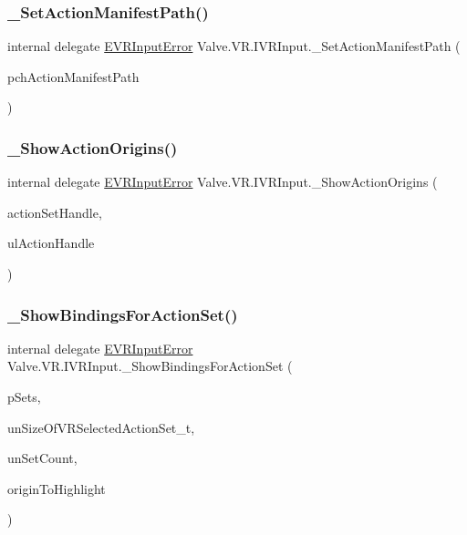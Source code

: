 \subsubsection{\texorpdfstring{\_SetActionManifestPath()}{\_SetActionManifestPath()}}
{\footnotesize\ttfamily internal delegate \mbox{\hyperlink{namespace_valve_1_1_v_r_a592d7f4189b8346d6c96dbdbaa35bc1b}{E\+V\+R\+Input\+Error}} Valve.\+V\+R.\+I\+V\+R\+Input.\+\_\+\+Set\+Action\+Manifest\+Path (\begin{DoxyParamCaption}\item[{string}]{pch\+Action\+Manifest\+Path }\end{DoxyParamCaption})}

\mbox{\label{struct_valve_1_1_v_r_1_1_i_v_r_input_a09f1677e540d63032f2fd346bcde9ff7}} 
\subsubsection{\texorpdfstring{\_ShowActionOrigins()}{\_ShowActionOrigins()}}
{\footnotesize\ttfamily internal delegate \mbox{\hyperlink{namespace_valve_1_1_v_r_a592d7f4189b8346d6c96dbdbaa35bc1b}{E\+V\+R\+Input\+Error}} Valve.\+V\+R.\+I\+V\+R\+Input.\+\_\+\+Show\+Action\+Origins (\begin{DoxyParamCaption}\item[{ulong}]{action\+Set\+Handle,  }\item[{ulong}]{ul\+Action\+Handle }\end{DoxyParamCaption})}

\mbox{\label{struct_valve_1_1_v_r_1_1_i_v_r_input_a88a0bc2f348e8f0bf77bf25907434041}} 
\subsubsection{\texorpdfstring{\_ShowBindingsForActionSet()}{\_ShowBindingsForActionSet()}}
{\footnotesize\ttfamily internal delegate \mbox{\hyperlink{namespace_valve_1_1_v_r_a592d7f4189b8346d6c96dbdbaa35bc1b}{E\+V\+R\+Input\+Error}} Valve.\+V\+R.\+I\+V\+R\+Input.\+\_\+\+Show\+Bindings\+For\+Action\+Set (\begin{DoxyParamCaption}\item[{\mbox{[}\+In, Out\mbox{]} \mbox{\hyperlink{struct_valve_1_1_v_r_1_1_v_r_active_action_set__t}{V\+R\+Active\+Action\+Set\+\_\+t}} \mbox{[}$\,$\mbox{]}}]{p\+Sets,  }\item[{uint}]{un\+Size\+Of\+V\+R\+Selected\+Action\+Set\+\_\+t,  }\item[{uint}]{un\+Set\+Count,  }\item[{ulong}]{origin\+To\+Highlight }\end{DoxyParamCaption})}

